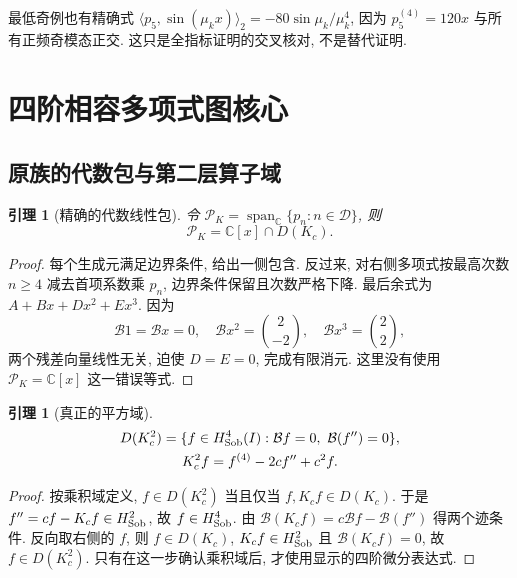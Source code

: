 \documentclass[UTF8]{ctexart}
\newtheorem{lemma}[theorem]{引理}
\begin{document}
最低奇例也有精确式
$\langle p_5,\sin(\mu_kx)\rangle_2=-80\sin\mu_k/\mu_k^4$,
因为 $p_5^{(4)}=120x$ 与所有正频奇模态正交.
这只是全指标证明的交叉核对, 不是替代证明.

\section{四阶相容多项式图核心}
\subsection{原族的代数包与第二层算子域}
\begin{lemma}[精确的代数线性包]\label{lem:algebra}
令 $\mathcal P_K=\operatorname{span}_{\mathbb C}\{p_n:n\in\mathcal D\}$, 则
\[
 \mathcal P_K=\mathbb C[x]\cap D(K_c).
\]
\end{lemma}
\begin{proof}
每个生成元满足边界条件, 给出一侧包含.
反过来, 对右侧多项式按最高次数 $n\ge4$ 减去首项系数乘 $p_n$,
边界条件保留且次数严格下降. 最后余式为 $A+Bx+Dx^2+Ex^3$.
因为
\[
 \mathcal B1=\mathcal Bx=0,\quad
 \mathcal Bx^2=\binom2{-2},\quad\mathcal Bx^3=\binom22,
\]
两个残差向量线性无关, 迫使 $D=E=0$, 完成有限消元.
这里没有使用 $\mathcal P_K=\mathbb C[x]$ 这一错误等式.
\end{proof}

\begin{lemma}[真正的平方域]\label{lem:square-domain}
\begin{equation}\label{eq:square-domain}
 \begin{gathered}
 D(K_c^2)=\{f\in H^4_{\rm Sob}(I):\mathcal Bf=0,\ \mathcal B(f'')=0\},\\
 K_c^2f=f^{(4)}-2cf''+c^2f.
 \end{gathered}
\end{equation}
\end{lemma}
\begin{proof}
按乘积域定义, $f\in D(K_c^2)$ 当且仅当 $f,K_cf\in D(K_c)$.
于是 $f''=cf-K_cf\in H^2_{\rm Sob}$, 故 $f\in H^4_{\rm Sob}$.
由 $\mathcal B(K_cf)=c\mathcal Bf-\mathcal B(f'')$ 得两个迹条件.
反向取右侧的 $f$, 则 $f\in D(K_c)$, $K_cf\in H^2_{\rm Sob}$
且 $\mathcal B(K_cf)=0$, 故 $f\in D(K_c^2)$.
只有在这一步确认乘积域后, 才使用显示的四阶微分表达式.
\end{proof}
\end{document}
